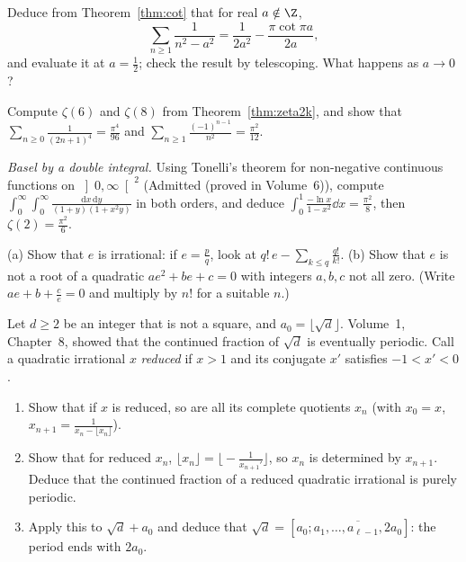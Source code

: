 \begin{exercise}[$\star$]\label{ex:cotsums}
Deduce from Theorem~\ref{thm:cot} that for real $a\notin\Z$,
\[
\sum_{n\ge1}\frac1{n^2-a^2}=\frac1{2a^2}-\frac{\pi\cot\pi a}{2a},
\]
and evaluate it at $a=\frac12$; check the result by telescoping. What happens as $a\to0$?
\end{exercise}

\begin{exercise}[$\star\star$]\label{ex:zetavalues}
Compute $\zeta(6)$ and $\zeta(8)$ from Theorem~\ref{thm:zeta2k}, and show that $\sum_{n\ge0}\frac1{(2n+1)^4}=\frac{\pi^4}{96}$ and
$\sum_{n\ge1}\frac{(-1)^{n-1}}{n^2}=\frac{\pi^2}{12}$.
\end{exercise}

\begin{exercise}[$\star\star$]\label{ex:ritelli}
\emph{Basel by a double integral.} Using Tonelli's theorem for non-negative continuous functions on $\left]0,\infty\right[^2$
(Admitted (proved in Volume~6)), compute $\int_0^\infty\!\int_0^\infty\frac{\mathrm dx\,\mathrm dy}{(1+y)(1+x^2y)}$ in both orders, and deduce
$\int_0^1\frac{-\ln x}{1-x^2}\dd x=\frac{\pi^2}8$, then $\zeta(2)=\frac{\pi^2}6$.
\end{exercise}

\begin{exercise}[$\star\star$]\label{ex:eirrational}
(a) Show that $e$ is irrational: if $e=\frac pq$, look at $q!\,e-\sum_{k\le q}\frac{q!}{k!}$.
(b) Show that $e$ is not a root of a quadratic $ae^2+be+c=0$ with integers $a,b,c$ not all zero. (Write $ae+b+\frac ce=0$
and multiply by $n!$ for a suitable $n$.)
\end{exercise}

\begin{exercise}[$\star\star\star$]\label{ex:sqrtperiod}
Let $d\ge2$ be an integer that is not a square, and $a_0=\lfloor\sqrt d\rfloor$. Volume~1, Chapter~8, showed that the continued fraction
of $\sqrt d$ is eventually periodic. Call a quadratic irrational $x$ \emph{reduced} if $x>1$ and its conjugate $x'$ satisfies
$-1<x'<0$.
\begin{enumerate}[label=(\alph*)]
\item Show that if $x$ is reduced, so are all its complete quotients $x_n$ (with $x_0=x$, $x_{n+1}=\frac1{x_n-\lfloor x_n\rfloor}$).
\item Show that for reduced $x_n$, $\lfloor x_n\rfloor=\bigl\lfloor-\frac1{x_{n+1}'}\bigr\rfloor$, so $x_n$ is determined by $x_{n+1}$. Deduce
that the continued fraction of a reduced quadratic irrational is purely periodic.
\item Apply this to $\sqrt d+a_0$ and deduce that $\sqrt d=[a_0;\overline{a_1,\dots,a_{\ell-1},2a_0}]$: the period ends with
$2a_0$.
\end{enumerate}
\end{exercise}

